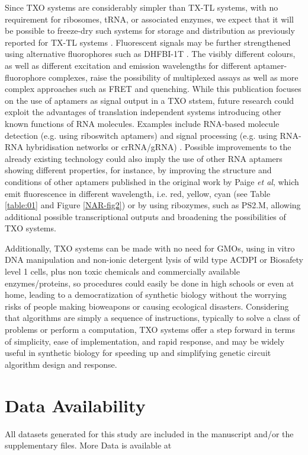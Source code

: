 Since TXO systems are considerably simpler than TX-TL systems, with no requirement for ribosomes, tRNA, or associated enzymes, we expect that it will be possible to freeze-dry such systems for storage and distribution as previously reported for TX-TL systems \cite{8, 28}. Fluorescent signals may be further strengthened using alternative fluorophores such as DHFBI-1T \cite{29}. The visibly different colours, as well as different excitation and emission wavelengths for different aptamer-fluorophore complexes, raise the possibility of multiplexed assays as well as more complex approaches such as FRET and quenching. While this publication focuses on the use of aptamers as signal output in a TXO ststem, future research could exploit the advantages of translation independent systems introducing other known functions of RNA molecules. Examples include RNA-based molecule detection (e.g. using riboswitch aptamers) and signal processing (e.g. using RNA-RNA hybridisation networks or crRNA/gRNA) \cite{30, 31,32,33,34,35}. Possible improvements to the already existing technology could also imply the use of other RNA aptamers showing different properties, for instance, by improving the structure and conditions of other aptamers published in the original work by Paige \textit{et al}, which emit fluorescence in different wavelength, i.e. red, yellow, cyan (see Table \ref{table:01} and Figure \ref{NAR-fig2}) or by using ribozymes, such as PS2.M, allowing additional possible transcriptional outputs and broadening the possibilities of TXO systems.

Additionally, TXO systems can be made with no need for GMOs, using in vitro DNA manipulation and non-ionic detergent lysis of wild type ACDPI or Biosafety level 1 cells, plus non toxic chemicals and commercially available enzymes/proteins, so procedures could easily be done in high schools or even at home, leading to a democratization of synthetic biology without the worrying risks of people making bioweapons or causing ecological disasters.
Considering that algorithms are simply a sequence of instructions, typically to solve a class of problems or perform a computation, TXO systems offer a step forward in terms of simplicity, ease of implementation, and rapid response, and may be widely useful in synthetic biology for speeding up and simplifying genetic circuit algorithm design and response.


\section{\textbf{Data Availability}}
All datasets generated for this study are included in the manuscript and/or the supplementary files. More Data is available at 

